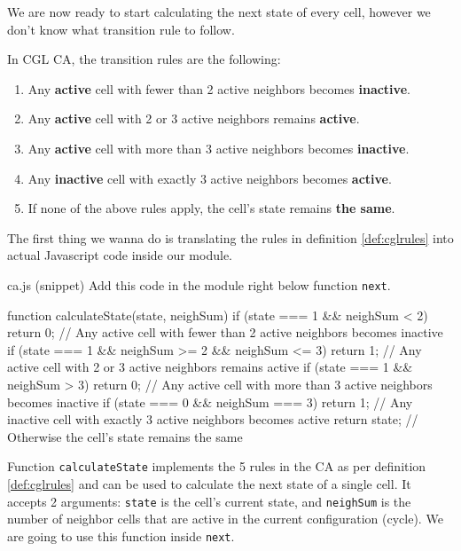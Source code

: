 We are now ready to start calculating the next state of every cell, however we don't know what
transition rule to follow.

\begin{definition}
\label{def:cglrules}
In CGL CA, the transition rules are the following:
\begin{enumerate}
\item Any \textbf{active} cell with fewer than 2 active neighbors becomes \textbf{inactive}.
\item Any \textbf{active} cell with 2 or 3 active neighbors remains \textbf{active}.
\item Any \textbf{active} cell with more than 3 active neighbors becomes \textbf{inactive}.
\item Any \textbf{inactive} cell with exactly 3 active neighbors becomes \textbf{active}.
\item If none of the above rules apply, the cell's state remains \textbf{the same}.
\end{enumerate}
\end{definition}

The first thing we wanna do is translating the rules in definition \ref{def:cglrules} into
actual Javascript code inside our module.

\begin{programcode}{ca.js (snippet)}
Add this code in the module right below function \texttt{next}.
\begin{code}
function calculateState(state, neighSum) {
  if (state === 1 && neighSum < 2) {
    return 0; // Any active cell with fewer than 2 active neighbors becomes inactive
  }
  if (state === 1 && neighSum >= 2 && neighSum <= 3) {
    return 1; // Any active cell with 2 or 3 active neighbors remains active
  }
  if (state === 1 && neighSum > 3) {
    return 0; // Any active cell with more than 3 active neighbors becomes inactive
  }
  if (state === 0 && neighSum === 3) {
    return 1; // Any inactive cell with exactly 3 active neighbors becomes active
  }
  return state; // Otherwise the cell's state remains the same
}
\end{code}
\end{programcode}

Function \texttt{calculateState} implements the 5 rules in the CA as per definition \ref{def:cglrules} and
can be used to calculate the next state of a single cell.
It accepts 2 arguments: \texttt{state} is the cell's current state, and \texttt{neighSum} is the number of
neighbor cells that are active in the current configuration (cycle).
We are going to use this function inside \texttt{next}.

